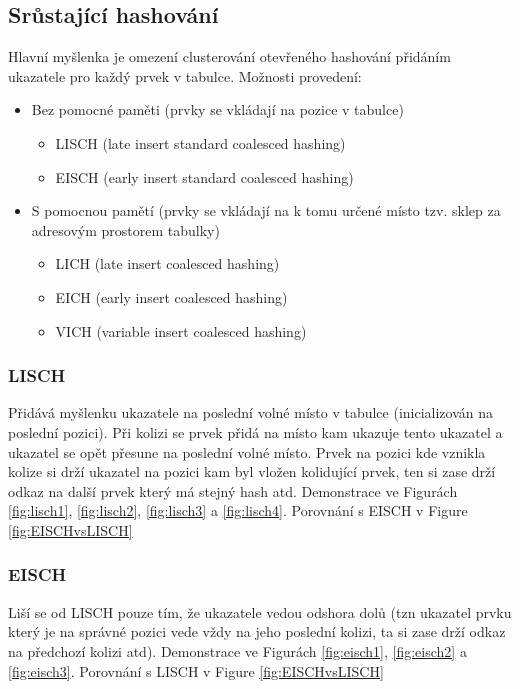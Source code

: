 \documentclass{book}
\begin{document}
\subsection{Srůstající hashování}
Hlavní myšlenka je omezení clusterování otevřeného hashování přidáním ukazatele pro každý prvek v tabulce. Možnosti provedení:
\begin{itemize}
\item Bez pomocné paměti (prvky se vkládají na pozice v tabulce)
\begin{itemize}
\item LISCH (late insert standard coalesced hashing)
\item EISCH (early insert standard coalesced hashing)
\end{itemize}
\item S pomocnou pamětí (prvky se vkládají na k tomu určené místo tzv. sklep za adresovým prostorem tabulky)
\begin{itemize}
\item LICH (late insert coalesced hashing)
\item EICH (early insert coalesced hashing)
\item VICH (variable insert coalesced hashing)
\end{itemize}
\end{itemize}

\subsubsection{LISCH}
Přidává myšlenku ukazatele na poslední volné místo v tabulce (inicializován na poslední pozici). Při kolizi se prvek přidá na místo kam ukazuje tento ukazatel a ukazatel se opět přesune na poslední volné místo. Prvek na pozici kde vznikla kolize si drží ukazatel na pozici kam byl vložen kolidující prvek, ten si zase drží odkaz na další prvek který má stejný hash atd. Demonstrace ve Figurách \ref{fig:lisch1}, \ref{fig:lisch2}, \ref{fig:lisch3} a \ref{fig:lisch4}. Porovnání s EISCH v Figure \ref{fig:EISCHvsLISCH}


\subsubsection{EISCH}
Liší se od LISCH pouze tím, že ukazatele vedou odshora dolů (tzn ukazatel prvku který je na správné pozici vede vždy na jeho poslední kolizi, ta si zase drží odkaz na předchozí kolizi atd). Demonstrace ve Figurách \ref{fig:eisch1}, \ref{fig:eisch2} a \ref{fig:eisch3}. Porovnání s LISCH v Figure \ref{fig:EISCHvsLISCH}
\end{document}
